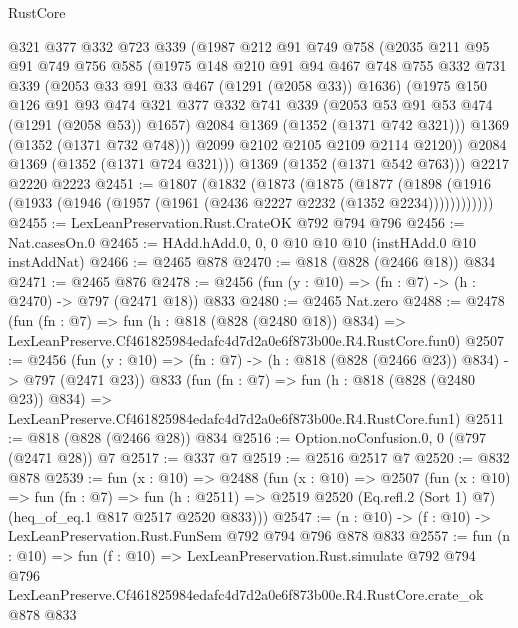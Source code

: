 \begin{lexlean}{RustCore}
\begin{coremodule}
        @321
        @377
        @332
        @723
        @339
        (@1987
          @212
          @91
          @749
          @758
          (@2035
            @211
            @95
            @91
            @749
            @756
            @585
            (@1975
              @148
              @210
              @91
              @94
              @467
              @748
              @755
              @332
              @731
              @339
              (@2053 @33 @91 @33 @467 (@1291 (@2058 @33)) @1636)
              (@1975
                @150
                @126
                @91
                @93
                @474
                @321
                @377
                @332
                @741
                @339
                (@2053 @53 @91 @53 @474 (@1291 (@2058 @53)) @1657)
                @2084
                @1369
                (@1352 (@1371 @742 @321)))
              @1369
              (@1352 (@1371 @732 @748)))
            @2099
            @2102
            @2105
            @2109
            @2114
            @2120))
        @2084
        @1369
        (@1352 (@1371 @724 @321)))
      @1369
      (@1352 (@1371 @542 @763)))
    @2217
    @2220
    @2223
@2451 := @1807
    (@1832
      (@1873
        (@1875
          (@1877
            (@1898 (@1916 (@1933 (@1946 (@1957 (@1961 (@2436 @2227 @2232 (@1352 @2234))))))))))))
@2455 := LexLeanPreservation.Rust.CrateOK @792 @794 @796
@2456 := Nat.casesOn.{0}
@2465 := HAdd.hAdd.{0, 0, 0} @10 @10 @10 (instHAdd.{0} @10 instAddNat)
@2466 := @2465 @878
@2470 := @818 (@828 (@2466 @18)) @834
@2471 := @2465 @876
@2478 := @2456 (fun (y : @10) => (fn : @7) -> (h : @2470) -> @797 (@2471 @18)) @833
@2480 := @2465 Nat.zero
@2488 := @2478
    (fun (fn : @7) =>
    fun (h : @818 (@828 (@2480 @18)) @834) =>
    LexLeanPreserve.Cf461825984edafc4d7d2a0e6f873b00e.R4.RustCore.fun0)
@2507 := @2456
    (fun (y : @10) => (fn : @7) -> (h : @818 (@828 (@2466 @23)) @834) -> @797 (@2471 @23))
    @833
    (fun (fn : @7) =>
    fun (h : @818 (@828 (@2480 @23)) @834) =>
    LexLeanPreserve.Cf461825984edafc4d7d2a0e6f873b00e.R4.RustCore.fun1)
@2511 := @818 (@828 (@2466 @28)) @834
@2516 := Option.noConfusion.{0, 0} (@797 (@2471 @28)) @7
@2517 := @337 @7
@2519 := @2516 @2517 @7
@2520 := @832 @878
@2539 := fun (x : @10) =>
  @2488
    (fun (x : @10) =>
    @2507
      (fun (x : @10) =>
      fun (fn : @7) =>
      fun (h : @2511) =>
      @2519 @2520 (Eq.refl.{2} (Sort 1) @7) (heq_of_eq.{1} @817 @2517 @2520 @833)))
@2547 := (n : @10) -> (f : @10) -> LexLeanPreservation.Rust.FunSem @792 @794 @796 @878 @833
@2557 := fun (n : @10) =>
  fun (f : @10) =>
  LexLeanPreservation.Rust.simulate
    @792
    @794
    @796
    LexLeanPreserve.Cf461825984edafc4d7d2a0e6f873b00e.R4.RustCore.crate_ok
    @878
    @833
\end{coremodule}
\end{lexlean}
